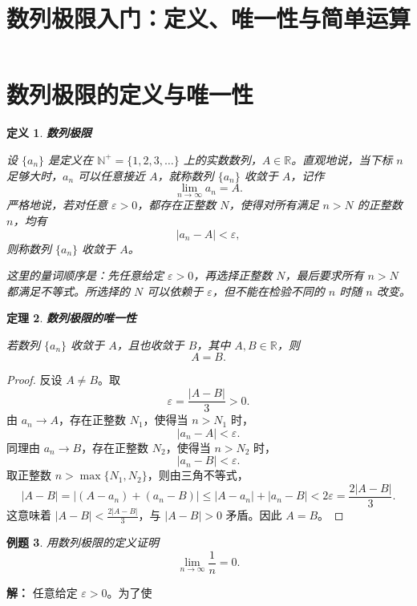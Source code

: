 \documentclass[UTF8,fontset=fandol,11pt]{ctexart}
\title{数列极限入门：定义、唯一性与简单运算}
\date{}
\newtheorem{definition}{定义}[section]
\newtheorem{theorem}[definition]{定理}
\newtheorem{example}[definition]{例题}
\begin{document}
\maketitle
\section{数列极限的定义与唯一性}\label{sec:S01}
\begin{definition}
\textbf{数列极限}\par

设 $\{a_n\}$ 是定义在 $\mathbb{N}^+=\{1,2,3,\ldots\}$ 上的实数数列，$A\in\mathbb{R}$。直观地说，当下标 $n$ 足够大时，$a_n$ 可以任意接近 $A$，就称数列 $\{a_n\}$ 收敛于 $A$，记作
\[
\lim_{n\to\infty}a_n=A.
\]
严格地说，若对任意 $\varepsilon>0$，都存在正整数 $N$，使得对所有满足 $n>N$ 的正整数 $n$，均有
\[
|a_n-A|<\varepsilon,
\]
则称数列 $\{a_n\}$ 收敛于 $A$。
\label{def:sequence-limit}


这里的量词顺序是：先任意给定 $\varepsilon>0$，再选择正整数 $N$，最后要求所有 $n>N$ 都满足不等式。所选择的 $N$ 可以依赖于 $\varepsilon$，但不能在检验不同的 $n$ 时随 $n$ 改变。
\end{definition}
\begin{theorem}
\textbf{数列极限的唯一性}\par

若数列 $\{a_n\}$ 收敛于 $A$，且也收敛于 $B$，其中 $A,B\in\mathbb{R}$，则
\[
A=B.
\]
\label{thm:limit-uniqueness}

\end{theorem}
\begin{proof}

反设 $A\ne B$。取
\[
\varepsilon=\frac{|A-B|}{3}>0.
\]
由 $a_n\to A$，存在正整数 $N_1$，使得当 $n>N_1$ 时，
\[
|a_n-A|<\varepsilon.
\]
同理由 $a_n\to B$，存在正整数 $N_2$，使得当 $n>N_2$ 时，
\[
|a_n-B|<\varepsilon.
\]
取正整数 $n>\max\{N_1,N_2\}$，则由三角不等式，
\[
|A-B|=|(A-a_n)+(a_n-B)|
\le |A-a_n|+|a_n-B|
<2\varepsilon=\frac{2|A-B|}{3}.
\]
这意味着 $|A-B|<\frac{2|A-B|}{3}$，与 $|A-B|>0$ 矛盾。因此 $A=B$。

\end{proof}
\begin{example}

用数列极限的定义证明
\[
\lim_{n\to\infty}\frac{1}{n}=0.
\]

\end{example}
\par\noindent\textbf{解：}
任意给定 $\varepsilon>0$。为了使
\end{document}
